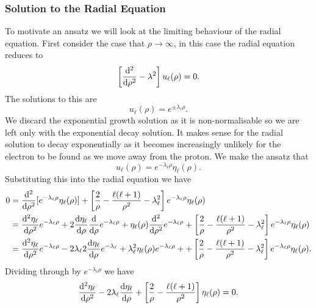 \documentclass[a4paper]{article}
\theoremstyle{definition}
\begin{document}
    \subsubsection{Solution to the Radial Equation}
    To motivate an ansatz we will look at the limiting behaviour of the radial equation.
    First consider the case that \(\rho \to \infty\), in this case the radial equation reduces to
    \[\left[\dv[2]{\rho} - \lambda^2\right]u_\ell(\rho) = 0.\]
    The solutions to this are
    \[u_\ell(\rho) = e^{\pm\lambda_\ell\rho}.\]
    We discard the exponential growth solution as it is non-normalisable so we are left only with the exponential decay solution.
    It makes sense for the radial solution to decay exponentially as it becomes increasingly unlikely for the electron to be found as we move away from the proton.
    We make the ansatz that
    \[u_\ell(\rho) = e^{-\lambda_\ell\rho}\eta_\ell(\rho).\]
    Substituting this into the radial equation we have
    \begin{align*}
        0 &= \dv[2]{\rho}[e^{-\lambda_\ell\rho}\eta_\ell(\rho)] + \left[\frac{2}{\rho} - \frac{\ell(\ell + 1)}{\rho^2} - \lambda_\ell^2\right]e^{-\lambda_\ell\rho}\eta_\ell(\rho)\\
        &= \dv[2]{\eta_\ell}{\rho}e^{-\lambda_\ell\rho} + 2\dv{\eta_\ell}{\rho}\dv{\rho}e^{-\lambda_\ell\rho} + \eta_\ell(\rho)\dv[2]{\rho}e^{-\lambda_\ell\rho} + \left[\frac{2}{\rho} - \frac{\ell(\ell + 1)}{\rho^2} - \lambda_\ell^2\right]e^{-\lambda_\ell\rho}\eta_\ell(\rho)\\
        &= \dv[2]{\eta_\ell}{\rho}e^{-\lambda_\ell\rho} -2\lambda_\ell 2\dv{\eta_\ell}{\rho}e^{-\lambda_\ell} + \lambda_\ell^2\eta_\ell(\rho)e^{-\lambda_\ell\rho} + + \left[\frac{2}{\rho} - \frac{\ell(\ell + 1)}{\rho^2} - \lambda_\ell^2\right]e^{-\lambda_\ell\rho}\eta_\ell(\rho).\\
    \end{align*}
    Dividing through by \(e^{-\lambda_\ell\rho}\) we have
    \begin{equation}\label{eqn:radial eqn in eta}
        \dv[2]{\eta_\ell}{\rho} - 2\lambda_\ell\dv{\eta_\ell}{\rho} +  \left[\frac{2}{\rho} - \frac{\ell(\ell + 1)}{\rho^2}\right]\eta_\ell(\rho) = 0.
    \end{equation}
    
\end{document}

